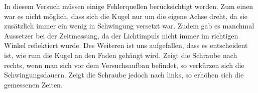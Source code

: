 In diesem Versuch müssen einige Fehlerquellen berücksichtigt werden. Zum einen war es nicht
möglich, dass sich die Kugel nur um die eigene Achse dreht, da sie zusätzlich immer
ein wenig in Schwingung versetzt war. Zudem gab es manchmal Aussetzer bei der Zeitmessung,
da der Lichtimpuls nicht immer im richtigen Winkel reflektiert wurde.
Des Weiteren ist uns aufgefallen, dass es entscheident ist, wie rum die Kugel an den Faden
gehängt wird. Zeigt die Schraube nach rechts, wenn man sich vor dem Versuchsaufbau befindet,
so verkürzen sich die Schwingungsdauern. Zeigt die Schraube jedoch nach links, so
erhöhen sich die gemessenen Zeiten.

